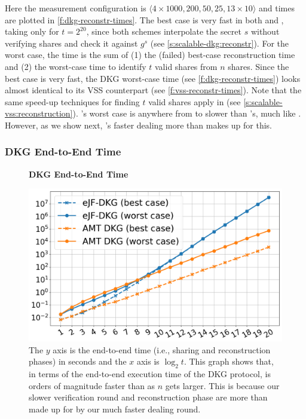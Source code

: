Here the measurement configuration is $\langle 4\times 1000, 200, 50, 25, 13\times 10\rangle$ and times are plotted in \cref{f:dkg-reconstr-times}.
The best case is very fast in both \ejfdkg and \ourdkg, taking only  for $t=2^{20}$, since both schemes interpolate the secret $s$ without verifying shares and check it against $g^s$ (see \cref{s:scalable-dkg:reconstr}).
For the worst case, the time is the sum of (1) the (failed) best-case reconstruction time and (2) the worst-case time to identify $t$ valid shares from $n$ shares.
Since the best case is very fast, the DKG worst-case time (see \cref{f:dkg-reconstr-times}) looks almost identical to its VSS counterpart (see \cref{f:vss-reconstr-times}).
Note that the same \ourvss speed-up techniques for finding $t$ valid shares apply in \ourdkg (see \cref{s:scalable-vss:reconstruction}).
\ourdkg's worst case is anywhere from  to  slower than \ejfdkg's, much like \ourvss.
However, as we show next, \ourdkg's faster dealing more than makes up for this.

\subsubsection{DKG End-to-End Time}
\label{s:eval:dkg:e2e-time}

\begin{figure}[t]
    \centering
    \textbf{DKG End-to-End Time}\par\medskip
    \includegraphics[width=0.70\columnwidth]{figures-thresh/dkg-e2e-times.png}
    \caption{
        The $y$ axis is the end-to-end time (i.e., sharing and reconstruction phases) in seconds and the $x$ axis is $\log_2{t}$.
        This graph shows that, in terms of the end-to-end execution time of the DKG protocol, \ourdkg is orders of magnitude faster than \ejfdkg as $n$ gets larger.
        This is because our slower verification round and reconstruction phase are more than made up for by our much faster dealing round.
    }
    \label{f:dkg-e2e-times}
\end{figure}

